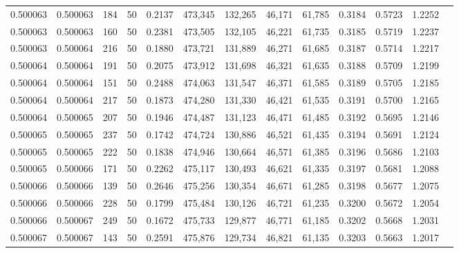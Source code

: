 \begin{tabular}{rrrrrrrrrrrrr}
0.500063 & 0.500063 &   184 &  50 &                                     0.2137 & 473,345 & 132,265 &  46,171 &  61,785 & 0.3184 & 0.5723 & 1.2252 \\
0.500063 & 0.500063 &   160 &  50 &                                     0.2381 & 473,505 & 132,105 &  46,221 &  61,735 & 0.3185 & 0.5719 & 1.2237 \\
0.500063 & 0.500064 &   216 &  50 &                                     0.1880 & 473,721 & 131,889 &  46,271 &  61,685 & 0.3187 & 0.5714 & 1.2217 \\
0.500064 & 0.500064 &   191 &  50 &                                     0.2075 & 473,912 & 131,698 &  46,321 &  61,635 & 0.3188 & 0.5709 & 1.2199 \\
0.500064 & 0.500064 &   151 &  50 &                                     0.2488 & 474,063 & 131,547 &  46,371 &  61,585 & 0.3189 & 0.5705 & 1.2185 \\
0.500064 & 0.500064 &   217 &  50 &                                     0.1873 & 474,280 & 131,330 &  46,421 &  61,535 & 0.3191 & 0.5700 & 1.2165 \\
0.500064 & 0.500065 &   207 &  50 &                                     0.1946 & 474,487 & 131,123 &  46,471 &  61,485 & 0.3192 & 0.5695 & 1.2146 \\
0.500065 & 0.500065 &   237 &  50 &                                     0.1742 & 474,724 & 130,886 &  46,521 &  61,435 & 0.3194 & 0.5691 & 1.2124 \\
0.500065 & 0.500065 &   222 &  50 &                                     0.1838 & 474,946 & 130,664 &  46,571 &  61,385 & 0.3196 & 0.5686 & 1.2103 \\
0.500065 & 0.500066 &   171 &  50 &                                     0.2262 & 475,117 & 130,493 &  46,621 &  61,335 & 0.3197 & 0.5681 & 1.2088 \\
0.500066 & 0.500066 &   139 &  50 &                                     0.2646 & 475,256 & 130,354 &  46,671 &  61,285 & 0.3198 & 0.5677 & 1.2075 \\
0.500066 & 0.500066 &   228 &  50 &                                     0.1799 & 475,484 & 130,126 &  46,721 &  61,235 & 0.3200 & 0.5672 & 1.2054 \\
0.500066 & 0.500067 &   249 &  50 &                                     0.1672 & 475,733 & 129,877 &  46,771 &  61,185 & 0.3202 & 0.5668 & 1.2031 \\
0.500067 & 0.500067 &   143 &  50 &                                     0.2591 & 475,876 & 129,734 &  46,821 &  61,135 & 0.3203 & 0.5663 & 1.2017 \\

\end{tabular}

